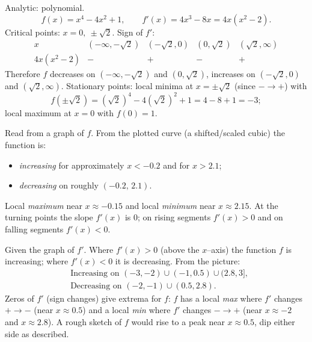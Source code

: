 \documentclass[11pt]{article}
\def\textbf#1{#1}%
\begin{document}

\begin{solution}
\textbf{ Analytic: polynomial.}
\[
f(x)=x^{4}-4x^{2}+1,\qquad f'(x)=4x^{3}-8x=4x(x^{2}-2).
\]
Critical points: $x=0,\ \pm\sqrt{2}$.
Sign of $f'$:
\[
\begin{array}{c|cccc}
x & (-\infty,-\sqrt2) & (-\sqrt2,0) & (0,\sqrt2) & (\sqrt2,\infty)\\ \hline
4x(x^{2}-2) & - & + & - & +
\end{array}
\]
Therefore $f$ decreases on $(-\infty,-\sqrt2)$ and $(0,\sqrt2)$, increases on $(-\sqrt2,0)$ and $(\sqrt2,\infty)$.  
Stationary points: local minima at $x=\pm\sqrt2$ (since $-\to +$) with
\[
f(\pm\sqrt2)= (\sqrt2)^4-4(\sqrt2)^2+1=4-8+1=-3;
\]
local maximum at $x=0$ with $f(0)=1$.
\end{solution}

\begin{solution}
\textbf{Read from a graph of $f$.}
From the plotted curve (a shifted/scaled cubic) the function is:
\begin{itemize}
  \item \emph{increasing} for approximately $x< -0.2$ and for $x>2.1$;
  \item \emph{decreasing} on roughly $(-0.2,\,2.1)$.
\end{itemize}
Local \emph{maximum} near $x\approx -0.15$ and local \emph{minimum} near $x\approx 2.15$.  
At the turning points the slope $f'(x)$ is $0$; on rising segments $f'(x)>0$ and on falling segments $f'(x)<0$.
\end{solution}

\begin{solution}
\textbf{Given the graph of $f'$.}
Where $f'(x)>0$ (above the $x$–axis) the function $f$ is increasing; where $f'(x)<0$ it is decreasing.  
From the picture:
\[
\begin{aligned}
&\text{Increasing on } (-3,-2)\cup(-1,0.5)\cup(2.8,3],\\
&\text{Decreasing on } (-2,-1)\cup(0.5,2.8).
\end{aligned}
\]
Zeros of $f'$ (sign changes) give extrema for $f$:  
$f$ has a local \emph{max} where $f'$ changes $+\to-$ (near $x\approx 0.5$) and a local \emph{min} where $f'$ changes $-\to+$ (near $x\approx -2$ and $x\approx 2.8$).  
A rough sketch of $f$ would rise to a peak near $x\approx0.5$, dip either side as described.
\end{solution}
\end{document}
